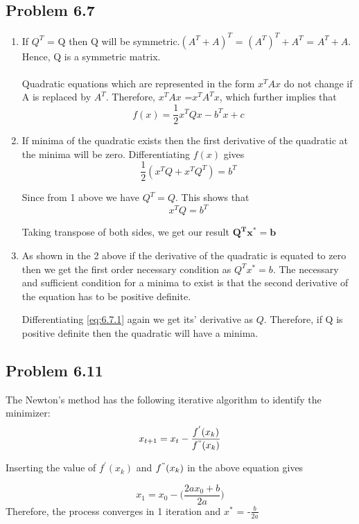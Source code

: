 \documentclass[letterpaper,12pt]{article}
\theoremstyle{definition}
\begin{document}
\subsection*{Problem 6.7}
\begin{enumerate}
    \item If $Q^T$ = Q then Q will be symmetric.$(A^T + A)^T$ = $(A^T)^T + A^T$ = $A^T + A$. Hence, Q is a symmetric matrix.\\\\
    Quadratic equations which are represented in the form $x^TAx$ do not change if A is replaced by $A^T$. Therefore, $x^TAx$ =$x^TA^Tx$, which further implies that
\begin{equation*}
f(x) = \frac{1}{2}x^TQx - b^Tx +c
\end{equation*}    
 \item If minima of the quadratic exists then the first derivative of the quadratic at the minima will be zero. Differentiating $f(x)$ gives
 \begin{equation*}\tag{6.7.1} \label{eq:6.7.1}
\frac{1}{2}(x^TQ + x^TQ^T) = b^T
\end{equation*}    
 
 Since from 1 above we have $Q^T = Q$. This shows that 
   \begin{equation*}
x^TQ  = b^T
\end{equation*}   

Taking transpose of both sides, we get our result 
$\mathbf {Q^Tx^* = b}$
\item As shown in the 2 above if the derivative of the quadratic is equated to zero then we get the first order necessary condition as  $ Q^Tx^* = b$. The necessary and sufficient condition for a minima to exist is that the second derivative of the equation has to be positive definite.

Differentiating \eqref{eq:6.7.1} again we get its' derivative as $Q$. Therefore, if Q is positive definite then the quadratic will have a minima.

\end{enumerate}

\subsection*{Problem 6.11}

The Newton's method has the following iterative algorithm to identify the minimizer:
  \begin{equation*}
x_{t+1}  =x_{t} - \frac{f^{'}(x_k)}{f^{"}(x_k)}
\end{equation*}  
\begin{flushleft}
Inserting the value of $f^{'}(x_k)$ and $f^{"}(x_k)$ in the above equation gives
\end{flushleft}
  \begin{equation*}
x_{1}  =x_{0} - \Big(\frac{2ax_{0}+b}{2a}\Big)
\end{equation*} 
Therefore, the process converges in 1 iteration and $x^*$ =  -$\frac{b}{2a}$ 
\end{document}
